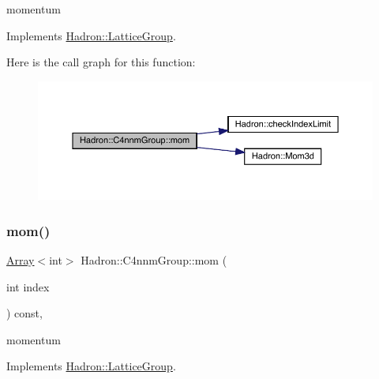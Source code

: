 momentum 

Implements \mbox{\hyperlink{structHadron_1_1LatticeGroup_ad577b65041dd9a6e84b1f3bd49cb8fce}{Hadron\+::\+Lattice\+Group}}.

Here is the call graph for this function\+:
\nopagebreak
\begin{figure}[H]
\begin{center}
\leavevmode
\includegraphics[width=350pt]{d1/dba/structHadron_1_1C4nnmGroup_a7553c7f91a8dc310b37b7b5da32e98f6_cgraph}
\end{center}
\end{figure}
\mbox{\label{structHadron_1_1C4nnmGroup_a7553c7f91a8dc310b37b7b5da32e98f6}} 
\subsubsection{\texorpdfstring{mom()}{mom()}\hspace{0.1cm}{\footnotesize\ttfamily [3/3]}}
{\footnotesize\ttfamily \mbox{\hyperlink{classXMLArray_1_1Array}{Array}}$<$int$>$ Hadron\+::\+C4nnm\+Group\+::mom (\begin{DoxyParamCaption}\item[{int}]{index }\end{DoxyParamCaption}) const\hspace{0.3cm}{\ttfamily [inline]}, {\ttfamily [virtual]}}

momentum 

Implements \mbox{\hyperlink{structHadron_1_1LatticeGroup_ad577b65041dd9a6e84b1f3bd49cb8fce}{Hadron\+::\+Lattice\+Group}}.

